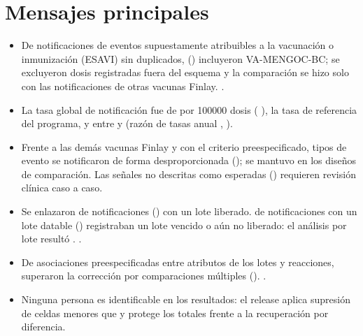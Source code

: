 \documentclass[11pt]{article}
\newcommand{\Mensaje}[1]{\item #1}
\begin{document}
\section*{Mensajes principales}
\begin{itemize}[leftmargin=*,itemsep=3pt]
\Mensaje{De \VReportsInWindow{} notificaciones de eventos supuestamente atribuibles a la
  vacunación o inmunización (ESAVI) sin duplicados, \PONTargetAll{} (\POPctTargetAll) incluyeron
  VA-MENGOC-BC; se excluyeron \PONScheduleInvalid{} dosis registradas fuera del esquema y la
  comparación se hizo solo con las \PONFinlayComparator{} notificaciones de otras vacunas Finlay.
  \VPartialYearsSentence.}
\Mensaje{La tasa global de notificación fue de \POPooledRate{} por \num{100000} dosis (\CI{}
  \POPooledRateCI), \PORateVsExpected{} la tasa de referencia del programa, y \POTrendWord{} entre
  \PORateFirstYear{} y \PORateLastYear{} (razón de tasas anual \POTrendRR, \CI{} \POTrendRRCI).}
\Mensaje{Frente a las demás vacunas Finlay y con el criterio preespecificado,
  \POSignalsPrimaryFinlayVaccines{} tipos de evento se
  notificaron de forma desproporcionada (\POSignalList); \PONSignalsRobustPhrase{} se mantuvo en los
  \PONDesigns{} diseños de comparación. Las señales no descritas como esperadas
  (\POSignalEmergingList) requieren revisión clínica caso a caso.}
\Mensaje{Se enlazaron \PTNLinked{} de \PTNTargetReports{} notificaciones (\PTLinkRate) con un lote
  liberado. \PTLotInconsistent{} de \PTLotAssessable{} notificaciones con un lote datable
  (\PTLotInconsistentPct) registraban un lote vencido o aún no liberado: el análisis por lote
  resultó \PTFeasibilityWord. \PTConformitySentence.}
\Mensaje{De \PTNPrimaryTests{} asociaciones preespecificadas entre atributos de los lotes y
  reacciones, \PTNSignificantFDR{} superaron la corrección por comparaciones múltiples
  (\PTSignificantList). \PTNegControlSentence.}
\Mensaje{Ninguna persona es identificable en los resultados: el release aplica supresión de celdas
  menores que \VMinCell{} y protege los totales frente a la recuperación por diferencia.}
\end{itemize}
\end{document}
